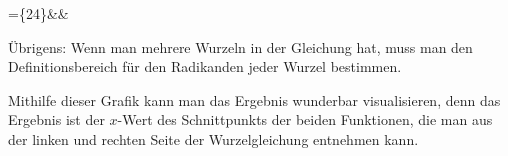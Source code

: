 \documentclass[12pt]{article}
\begin{document}
	\begin{flalign*}
	=\{24\}&&
	\end{flalign*}
	Übrigens: Wenn man mehrere Wurzeln in der Gleichung hat, muss man den Definitionsbereich für den Radikanden jeder Wurzel bestimmen.
	\begin{center}
	\end{center}
	Mithilfe dieser Grafik kann man das Ergebnis wunderbar visualisieren, denn das Ergebnis ist der $x$-Wert des Schnittpunkts der beiden Funktionen, die man aus der linken und rechten Seite der Wurzelgleichung entnehmen kann.
\end{document}
